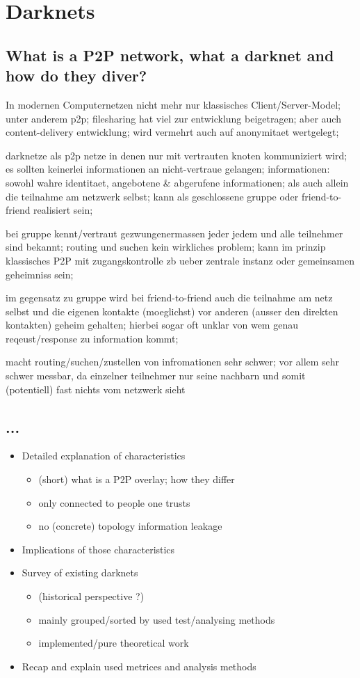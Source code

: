 \chapter{Darknets}

\section{What is a P2P network, what a darknet and how do they diver?}
In modernen Computernetzen nicht mehr nur klassisches Client/Server-Model; unter anderem p2p; filesharing hat viel zur entwicklung beigetragen; aber auch content-delivery entwicklung; wird vermehrt auch auf anonymitaet wertgelegt;

darknetze als p2p netze in denen nur mit vertrauten knoten kommuniziert wird; es sollten keinerlei informationen an nicht-vertraue gelangen; informationen: sowohl wahre identitaet, angebotene & abgerufene informationen; als auch allein die teilnahme am netzwerk selbst; kann als geschlossene gruppe oder friend-to-friend realisiert sein;

bei gruppe kennt/vertraut gezwungenermassen jeder jedem und alle teilnehmer sind bekannt; routing und suchen kein wirkliches problem; kann im prinzip klassisches P2P mit zugangskontrolle zb ueber zentrale instanz oder gemeinsamen geheimniss sein;

im gegensatz zu gruppe wird bei friend-to-friend auch die teilnahme am netz selbst und die eigenen kontakte (moeglichst) vor anderen (ausser den direkten kontakten) geheim gehalten; hierbei sogar oft unklar von wem genau reqeust/response zu information kommt;

macht routing/suchen/zustellen von infromationen sehr schwer; vor allem sehr schwer messbar, da einzelner teilnehmer nur seine nachbarn und somit (potentiell) fast nichts vom netzwerk sieht


\section{...}
\begin{itemize}
\item    Detailed explanation of characteristics
\begin{itemize}
\item        (short) what is a P2P overlay; how they differ
\item        only connected to people one trusts
\item        no (concrete) topology information leakage
\end{itemize}
\item    Implications of those characteristics
\item    Survey of existing darknets
\begin{itemize}
\item        (historical perspective ?)
\item        mainly grouped/sorted by used test/analysing methods
\item        implemented/pure theoretical work
\end{itemize}
\item    Recap and explain used metrices and analysis methods
\end{itemize}
